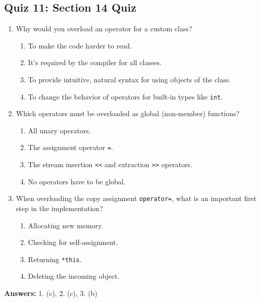 \subsection{Quiz 11: Section 14 Quiz}
\begin{enumerate}
	\item Why would you overload an operator for a custom class?
	\begin{enumerate}
		\item[a)] To make the code harder to read.
		\item[b)] It's required by the compiler for all classes.
		\item[c)] To provide intuitive, natural syntax for using objects of the class.
		\item[d)] To change the behavior of operators for built-in types like \texttt{int}.
	\end{enumerate}

	\item Which operators must be overloaded as global (non-member) functions?
	\begin{enumerate}
		\item[a)] All unary operators.
		\item[b)] The assignment operator \texttt{=}.
		\item[c)] The stream insertion \texttt{<<} and extraction \texttt{>>} operators.
		\item[d)] No operators have to be global.
	\end{enumerate}

	\item When overloading the copy assignment \texttt{operator=}, what is an important first step in the implementation?
	\begin{enumerate}
		\item[a)] Allocating new memory.
		\item[b)] Checking for self-assignment.
		\item[c)] Returning \texttt{*this}.
		\item[d)] Deleting the incoming object.
	\end{enumerate}
\end{enumerate}

\textbf{Answers:} 1. (c), 2. (c), 3. (b)
